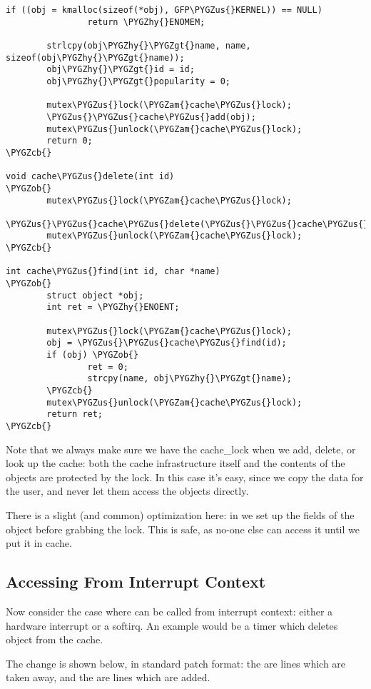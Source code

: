 \documentclass[a4paper,8pt,english]{sphinxmanual}
\def\PYGZus{\char`\_}
\def\PYGZob{\char`\{}
\def\PYGZcb{\char`\}}
\def\PYGZam{\char`\&}
\def\PYGZgt{\char`\>}
\def\PYGZhy{\char`\-}
\begin{document}
\begin{Verbatim}[commandchars=\\\{\}]
        if ((obj = kmalloc(sizeof(*obj), GFP\PYGZus{}KERNEL)) == NULL)
                return \PYGZhy{}ENOMEM;

        strlcpy(obj\PYGZhy{}\PYGZgt{}name, name, sizeof(obj\PYGZhy{}\PYGZgt{}name));
        obj\PYGZhy{}\PYGZgt{}id = id;
        obj\PYGZhy{}\PYGZgt{}popularity = 0;

        mutex\PYGZus{}lock(\PYGZam{}cache\PYGZus{}lock);
        \PYGZus{}\PYGZus{}cache\PYGZus{}add(obj);
        mutex\PYGZus{}unlock(\PYGZam{}cache\PYGZus{}lock);
        return 0;
\PYGZcb{}

void cache\PYGZus{}delete(int id)
\PYGZob{}
        mutex\PYGZus{}lock(\PYGZam{}cache\PYGZus{}lock);
        \PYGZus{}\PYGZus{}cache\PYGZus{}delete(\PYGZus{}\PYGZus{}cache\PYGZus{}find(id));
        mutex\PYGZus{}unlock(\PYGZam{}cache\PYGZus{}lock);
\PYGZcb{}

int cache\PYGZus{}find(int id, char *name)
\PYGZob{}
        struct object *obj;
        int ret = \PYGZhy{}ENOENT;

        mutex\PYGZus{}lock(\PYGZam{}cache\PYGZus{}lock);
        obj = \PYGZus{}\PYGZus{}cache\PYGZus{}find(id);
        if (obj) \PYGZob{}
                ret = 0;
                strcpy(name, obj\PYGZhy{}\PYGZgt{}name);
        \PYGZcb{}
        mutex\PYGZus{}unlock(\PYGZam{}cache\PYGZus{}lock);
        return ret;
\PYGZcb{}
\end{Verbatim}

Note that we always make sure we have the cache\_lock when we add,
delete, or look up the cache: both the cache infrastructure itself and
the contents of the objects are protected by the lock. In this case it's
easy, since we copy the data for the user, and never let them access the
objects directly.

There is a slight (and common) optimization here: in
 we set up the fields of the object before
grabbing the lock. This is safe, as no-one else can access it until we
put it in cache.


\subsection{Accessing From Interrupt Context}
\label{kernel-hacking/locking:accessing-from-interrupt-context}
Now consider the case where  can be called
from interrupt context: either a hardware interrupt or a softirq. An
example would be a timer which deletes object from the cache.

The change is shown below, in standard patch format: the \code{-} are lines
which are taken away, and the \code{+} are lines which are added.
\end{document}

